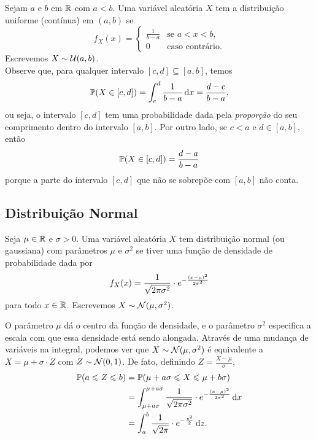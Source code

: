 Sejam $a$ e $b$ em $\mathbb{R}$ com $a < b$. Uma variável aleatória $X$ tem a distribuição uniforme (contínua) em $(a,b)$ se
\[
f_X(x) =
\begin{cases}
\frac{1}{b-a}&\text{se } a < x < b,\\
0&\text{caso contrário.}
\end{cases}
\]
Escrevemos $X \sim \mathcal{U}(a,b)$.\\

Observe que, para qualquer intervalo $[c,d] \subseteq [a,b]$, temos
\[
\mathbb{P}(X \in [c,d]) = \int_{c}^d \frac{1}{b-a} \, \mathrm{d} x
=
\frac{d-c}{b-a}
,
\]
ou seja, o intervalo $[c,d]$ tem uma probabilidade dada pela \emph{proporção} do seu comprimento dentro do intervalo $[a,b]$. Por outro lado, se $c < a$ e $d \in [a,b]$, então
\[
\mathbb{P}(X \in [c,d])
=
\frac{d-a}{b-a}
\]
porque a parte do intervalo $[c,d]$ que não se sobrepõe com $[a,b]$ não conta.


\subsection{Distribuição Normal}

Seja $\mu \in \mathbb{R}$ e $\sigma > 0$. Uma variável aleatória $X$ tem distribuição normal (ou gaussiana) com parâmetros $\mu$ e $\sigma^2$ se tiver uma função de densidade de probabilidade dada por
\[
f_X(x) = \frac{1}{\sqrt{2\pi \sigma^2}} \cdot e ^{-\frac{(x-\mu)^2}{2\sigma^2}}
\]
para todo $ x \in \mathbb{R} $.
Escrevemos $X \sim \mathcal{N} (\mu,\sigma^2)$.

O parâmetro $ \mu $ dá o centro da função de densidade, e o parâmetro $ \sigma^2 $ especifica a escala com que essa densidade está sendo alongada.
Através de uma mudança de variáveis na integral, podemos ver que
$X \sim \mathcal{N} (\mu,\sigma^2)$
é equivalente a
$ X = \mu + \sigma\cdot Z $ com $ Z \sim \mathcal{N}(0,1) $.
De fato, definindo $ Z = \frac{X-\mu}{\sigma} $,
\begin{align}
\mathbb{P}(a \leqslant Z \leqslant b)
&
=
\mathbb{P}(\mu + a\sigma \leqslant X \leqslant \mu+ b\sigma)
\\
&
=
\int_{\mu + a\sigma}^{\mu + a\sigma}
\frac{1}{\sqrt{2\pi \sigma^2}} \cdot e ^{-\frac{(x-\mu)^2}{2\sigma^2}}
\, \mathrm{d} x
\\
&
=
\int_a^b
\frac{1}{\sqrt{2\pi}} \cdot e ^{-\frac{z^2}{2}}
\, \mathrm{d} z
.
\end{align}

